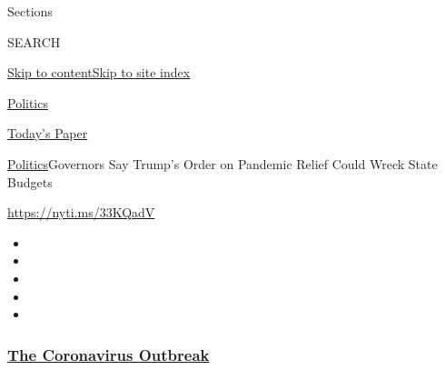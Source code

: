 Sections

SEARCH

\protect\hyperlink{site-content}{Skip to
content}\protect\hyperlink{site-index}{Skip to site index}

\href{https://www.nytimes3xbfgragh.onion/section/politics}{Politics}

\href{https://myaccount.nytimes3xbfgragh.onion/auth/login?response_type=cookie\&client_id=vi}{}

\href{https://www.nytimes3xbfgragh.onion/section/todayspaper}{Today's
Paper}

\href{/section/politics}{Politics}\textbar{}Governors Say Trump's Order
on Pandemic Relief Could Wreck State Budgets

\url{https://nyti.ms/33KQadV}

\begin{itemize}
\item
\item
\item
\item
\item
\end{itemize}

\hypertarget{the-coronavirus-outbreak}{%
\subsubsection{\texorpdfstring{\href{https://www.nytimes3xbfgragh.onion/news-event/coronavirus?name=styln-coronavirus-national\&region=TOP_BANNER\&variant=undefined\&block=storyline_menu_recirc\&action=click\&pgtype=Article\&impression_id=df54e6e0-e37a-11ea-9d29-b1d4cf4b3021}{The
Coronavirus
Outbreak}}{The Coronavirus Outbreak}}\label{the-coronavirus-outbreak}}

